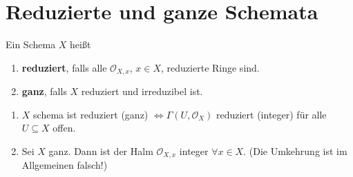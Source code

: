 \section{Reduzierte und ganze Schemata }
\begin{defn}[21]
  Ein Schema $X$ heißt 
  \begin{enumerate}
  \item \textbf{reduziert}, falls alle $\mathcal{O}_{X,x}$, $x\in X$, reduzierte
    Ringe sind.
  \item \textbf{ganz}, falls $X$ reduziert und irreduzibel ist.
  \end{enumerate}
\end{defn}

\begin{prop}[22]
  \mbox{}
  \begin{enumerate}
  \item $X$ schema ist reduziert (ganz) $\Leftrightarrow\Gamma(U,\mathcal{O}_{X})$
    reduziert (integer) für alle $U\subseteq X$ offen.
  \item Sei $X$ ganz. Dann ist der Halm $\mathcal{O}_{X,x}$ integer $\forall x\in X$.
    (Die Umkehrung ist im Allgemeinen falsch!)
  \end{enumerate}
\end{prop}


